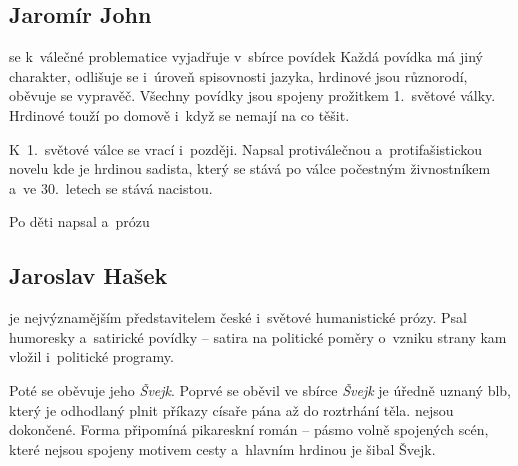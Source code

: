 \subsection*{Jaromír John}
 se k~válečné problematice vyjadřuje v~sbírce
povídek  Každá povídka má jiný charakter,
odlišuje se i~úroveň spisovnosti jazyka, hrdinové jsou různorodí,
oběvuje se vypravěč. Všechny povídky jsou spojeny prožitkem 1.~světové
války. Hrdinové touží po domově i~když se nemají na co těšit.

K~1.~světové válce se vrací i~později. Napsal protiválečnou
a~protifašistickou novelu  kde je hrdinou sadista,
který se stává po válce počestným živnostníkem a~ve 30.~letech se stává
nacistou.

Po děti napsal  a~prózu 

\subsection*{Jaroslav Hašek}
 je nejvýznamějším představitelem české i~světové
humanistické prózy. Psal humoresky a~satirické povídky -- 
 
satira na politické poměry o~vzniku strany  kam vložil i~politické programy.

Poté se oběvuje jeho \emph{Švejk}. Poprvé se oběvil ve sbírce
 \emph{Švejk} je úředně uznaný
blb, který je odhodlaný plnit příkazy císaře pána až do roztrhání těla.
 nejsou dokončené.
Forma připomíná pikareskní román -- pásmo volně spojených scén, které
nejsou spojeny motivem cesty a~hlavním hrdinou je šibal Švejk.

